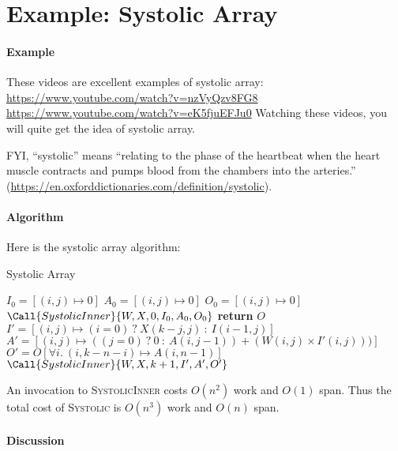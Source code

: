 \documentclass[11pt,a4paper,oneside,microtype,nokorean]{oblivoir}
\begin{document}
\section{Example: Systolic Array}

\paragraph{Example}

These videos are excellent examples of systolic array:
\url{https://www.youtube.com/watch?v=nzVyQzv8FG8} \url{https://www.youtube.com/watch?v=eK5fjuEFJu0}
Watching these videos, you will quite get the idea of systolic array.

FYI, ``systolic'' means ``relating to the phase of the heartbeat when the heart muscle contracts and
pumps blood from the chambers into the arteries.''
(\url{https://en.oxforddictionaries.com/definition/systolic}).


\paragraph{Algorithm}

Here is the systolic array algorithm:

\begin{algorithm}
  \caption{Systolic Array}\label{systolic}
  \begin{algorithmic}[1]
     
    \State $I_0 = [(i,j) \mapsto 0]$ 
    \State $A_0 = [(i,j) \mapsto 0]$ 
    \State $O_0 = [(i,j) \mapsto 0]$ 
    \State $\Call{SystolicInner}{W,X,0,I_0,A_0,O_0}$
    \EndProcedure
    \Statex
     
    \State \textbf{return} $O$
    \EndIf
    \State $I' = [(i,j) \mapsto (i=0)~?~X(k-j,j)~:~I(i-1,j)]$
    \State $A' = [(i,j) \mapsto ((j=0)~?~0~:~A(i,j-1)) + (W(i,j) \times I'(i,j)))]$
    \State $O' = O[\forall i.~(i,k-n-i) \mapsto A(i,n-1)]$
    \State $\Call{SystolicInner}{W,X,k+1,I',A',O'}$
    \EndProcedure
  \end{algorithmic}
\end{algorithm}

An invocation to \textsc{SystolicInner} costs $O(n^2)$ work and $O(1)$ span.  Thus the total cost of
\textsc{Systolic} is $O(n^3)$ work and $O(n)$ span.


\paragraph{Discussion}
\end{document}
